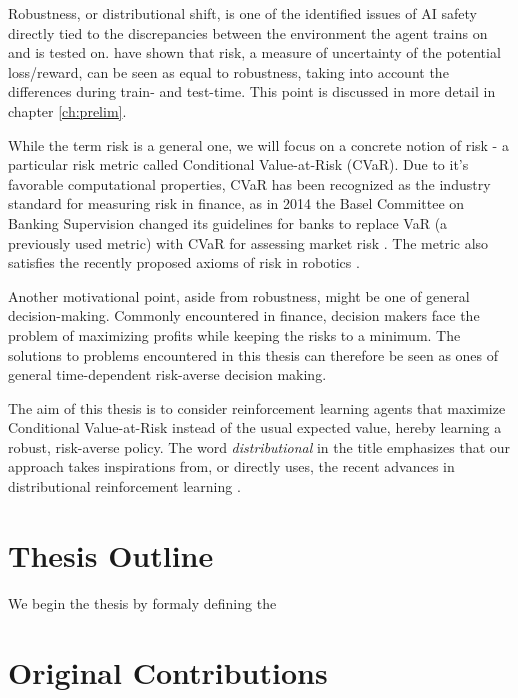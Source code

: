 Robustness, or distributional shift, is one of the identified issues of AI safety \citep{leike2017ai, amodei2016concrete, leike2017ai} directly tied to the discrepancies between the environment the agent trains on and is tested on. \citet{chow2015risk} have shown that risk, a measure of uncertainty of the potential loss/reward, can be seen as equal to robustness, taking into account the differences during train- and test-time. This point is discussed in more detail in chapter \ref{ch:prelim}.

While the term risk is a general one, we will focus on a concrete notion of risk - a particular risk metric called Conditional Value-at-Risk (CVaR). 
Due to it's favorable computational properties, CVaR has been recognized as the industry standard for measuring risk in finance, as in 2014 the Basel Committee on Banking Supervision changed its guidelines for banks to replace VaR (a previously used metric) with CVaR for assessing market risk \citep{basel2013fundamental}. The metric also satisfies the recently proposed axioms of risk in robotics \citep{majumdar2017should}.

Another motivational point, aside from robustness, might be one of general decision-making. Commonly encountered in finance, decision makers face the problem of maximizing profits while keeping the risks to a minimum. The solutions to problems encountered in this thesis can therefore be seen as ones of general time-dependent risk-averse decision making.

The aim of this thesis is to consider reinforcement learning agents that maximize Conditional Value-at-Risk instead of the usual expected value, hereby learning a robust, risk-averse policy. The word \textit{distributional} in the title emphasizes that our approach takes inspirations from, or directly uses, the recent advances in distributional reinforcement learning \citep{bellemare2017distributional, dabney2017distributional}.



\section{Thesis Outline}

We begin the thesis by formaly defining the 




\section{Original Contributions}

